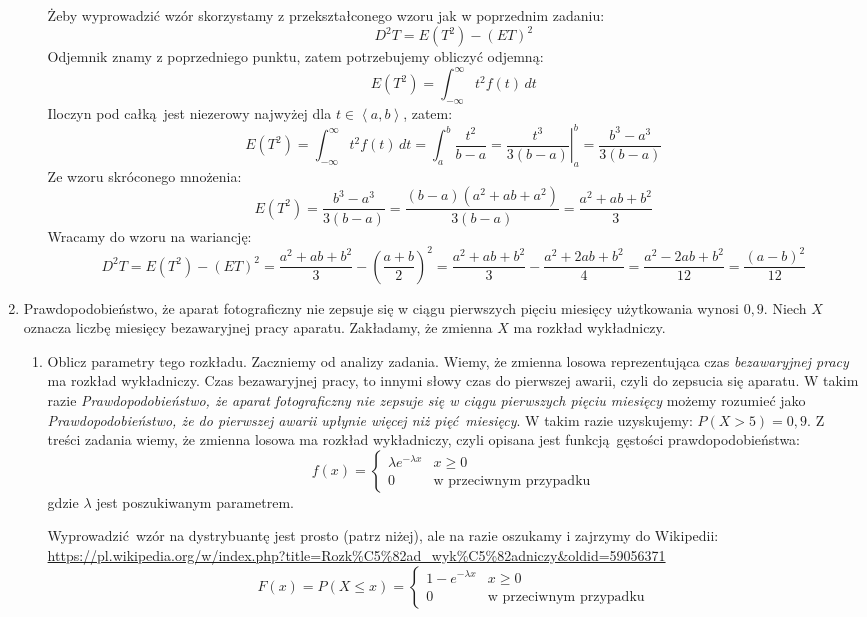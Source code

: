 \documentclass[twoside]{mwart}
\newenvironment{ansenv}{\comment}{\endcomment}
\newenvironment{ansenv}{\paragraph{Odpowiedź:}}{}
\begin{document}
\begin{enumerate}
\begin{enumerate}
\begin{ansenv}
	Żeby wyprowadzić wzór skorzystamy z przekształconego wzoru jak w poprzednim zadaniu:
	\[ D^2T = E\left(T^2\right) - \left(ET\right)^2 \]
	Odjemnik znamy z poprzedniego punktu, zatem potrzebujemy obliczyć odjemną:
	\[ E\left(T^2\right) = \int_{-\infty}^\infty t^2f(t)\,dt \]
	Iloczyn pod całką jest niezerowy najwyżej dla $t\in\left<a,b\right>$, zatem:
	\[ E\left(T^2\right) = \int_{-\infty}^\infty t^2f(t)\,dt = \int_a^b \frac{t^2}{b-a} = \left.\frac{t^3}{3(b-a)}\right|_a^b = \frac{b^3-a^3}{3(b-a)} \]
	Ze wzoru skróconego mnożenia:
	\[ E\left(T^2\right) = \frac{b^3-a^3}{3(b-a)} = \frac{(b-a)(a^2+ab+a^2)}{3(b-a)} = \frac{a^2+ab+b^2}{3} \]
	Wracamy do wzoru na wariancję:
	\[ D^2T = E\left(T^2\right) - \left(ET\right)^2 = \frac{a^2+ab+b^2}{3} - \left(\frac{a+b}{2}\right)^2 = \frac{a^2+ab+b^2}{3} - \frac{a^2+2ab+b^2}{4} = \frac{a^2-2ab+b^2}{12} = \frac{(a-b)^2}{12} \]
\end{ansenv}
\end{enumerate}
\item Prawdopodobieństwo, że aparat fotograficzny nie zepsuje się w ciągu pierwszych pięciu miesięcy użytkowania wynosi $0{,}9$. Niech $X$ oznacza liczbę miesięcy bezawaryjnej pracy aparatu. Zakładamy, że zmienna $X$ ma rozkład wykładniczy.
\begin{enumerate}
\item Oblicz parametry tego rozkładu. 
\begin{ansenv}
	Zaczniemy od analizy zadania. Wiemy, że zmienna losowa reprezentująca czas \emph{bezawaryjnej pracy} ma rozkład wykładniczy. Czas bezawaryjnej pracy, to innymi słowy czas do pierwszej awarii, czyli do zepsucia się aparatu.
	W takim razie \emph{Prawdopodobieństwo, że aparat fotograficzny nie zepsuje się w ciągu pierwszych pięciu miesięcy} możemy rozumieć jako \emph{Prawdopodobieństwo, że do pierwszej awarii upłynie więcej niż pięć miesięcy}.
	W takim razie uzyskujemy: $P(X>5)=0{,}9$.
	Z treści zadania wiemy, że zmienna losowa ma rozkład wykładniczy, czyli opisana jest funkcją gęstości prawdopodobieństwa:
	\[ f(x) = \begin{cases} \lambda e^{-\lambda x} & x\geq 0 \\ 0 & \text{w przeciwnym przypadku} \end{cases} \]
	gdzie $\lambda$ jest poszukiwanym parametrem.
	
	Wyprowadzić wzór na dystrybuantę jest prosto (patrz niżej), ale na razie oszukamy i zajrzymy do Wikipedii: \url{https://pl.wikipedia.org/w/index.php?title=Rozk%C5%82ad_wyk%C5%82adniczy&oldid=59056371}
	\[ F(x) = P(X\leq x) = \begin{cases} 1-e^{-\lambda x} & x\geq 0 \\ 0 & \text{w przeciwnym przypadku} \end{cases} \]
	

\end{ansenv}
\end{enumerate}
\end{enumerate}
\end{document}
